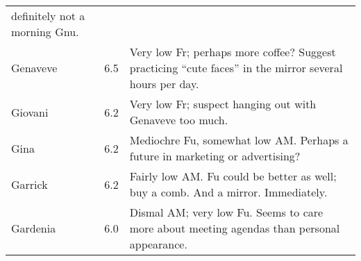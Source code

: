 \begin{landscape}
\begin{longtable}{lcp{4.5in}}
  definitely not a morning Gnu. \\ 
Genaveve & 6.5 & Very low Fr; perhaps more coffee?  Suggest practicing
  ``cute faces'' in the mirror several hours per day.  \\
Giovani & 6.2 & Very low Fr; suspect hanging out with Genaveve too
  much. \\
Gina & 6.2 & Mediochre Fu, somewhat low AM.  Perhaps a future in
  marketing or advertising? \\
Garrick & 6.2 & Fairly low AM.  Fu could be better as well; buy a
  comb.  And a mirror.  Immediately.  \\
Gardenia & 6.0 & Dismal AM; very low Fu.  Seems to care more about
  meeting agendas than personal appearance. \\
\end{longtable}
\end{landscape}


%
% 
% 
